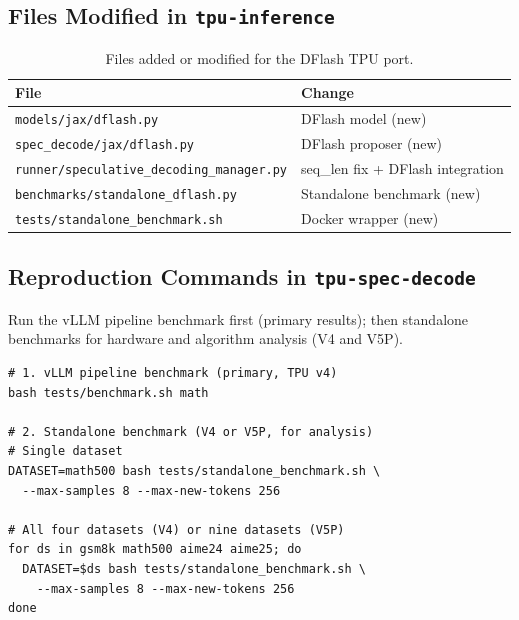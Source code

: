 \documentclass[12pt,letterpaper]{article}
\begin{document}
\clearpage


\makereference





\clearpage
\makeappendix

\subsection{Files Modified in \texttt{tpu-inference}}

\begin{table}[htbp]
\caption{Files added or modified for the DFlash TPU port.}
\centering
\begin{tabular}{l|l}
\toprule
File & Change \\
\midrule
\texttt{models/jax/dflash.py} & DFlash model (new) \\
\texttt{spec\_decode/jax/dflash.py} & DFlash proposer (new) \\
\texttt{runner/speculative\_decoding\_manager.py} & seq\_len fix + DFlash integration \\
\texttt{benchmarks/standalone\_dflash.py} & Standalone benchmark (new) \\
\texttt{tests/standalone\_benchmark.sh} & Docker wrapper (new) \\
\bottomrule
\end{tabular}
\end{table}

\subsection{Reproduction Commands in \texttt{tpu-spec-decode}}

Run the vLLM pipeline benchmark first (primary results); then standalone benchmarks for hardware and algorithm analysis (V4 and V5P).

\begin{verbatim}
# 1. vLLM pipeline benchmark (primary, TPU v4)
bash tests/benchmark.sh math

# 2. Standalone benchmark (V4 or V5P, for analysis)
# Single dataset
DATASET=math500 bash tests/standalone_benchmark.sh \
  --max-samples 8 --max-new-tokens 256

# All four datasets (V4) or nine datasets (V5P)
for ds in gsm8k math500 aime24 aime25; do
  DATASET=$ds bash tests/standalone_benchmark.sh \
    --max-samples 8 --max-new-tokens 256
done
\end{verbatim}
\end{document}
